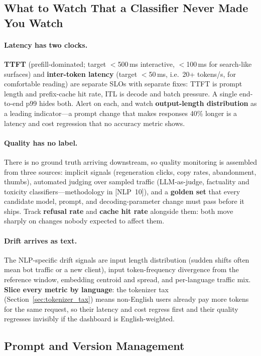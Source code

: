 \subsection{What to Watch That a Classifier Never Made You Watch}

\paragraph{Latency has two clocks.}  \textbf{TTFT} (prefill-dominated; target
$<$500\,ms interactive, $<$100\,ms for search-like surfaces) and
\textbf{inter-token latency} (target $<$50\,ms, i.e.\ 20+ tokens/s, for
comfortable reading) are separate SLOs with separate fixes: TTFT is prompt
length and prefix-cache hit rate, ITL is decode and batch pressure.  A single
end-to-end p99 hides both.  Alert on each, and watch \textbf{output-length
distribution} as a leading indicator---a prompt change that makes responses
40\% longer is a latency and cost regression that no accuracy metric shows.

\paragraph{Quality has no label.}  There is no ground truth arriving
downstream, so quality monitoring is assembled from three sources: implicit
signals (regeneration clicks, copy rates, abandonment, thumbs), automated
judging over sampled traffic (LLM-as-judge, factuality and toxicity
classifiers---methodology in [NLP~10]), and a \textbf{golden set} that every
candidate model, prompt, and decoding-parameter change must pass before it
ships.  Track \textbf{refusal rate} and \textbf{cache hit rate} alongside
them: both move sharply on changes nobody expected to affect them.

\paragraph{Drift arrives as text.}  The NLP-specific drift signals are input
length distribution (sudden shifts often mean bot traffic or a new client),
input token-frequency divergence from the reference window, embedding
centroid and spread, and per-language traffic mix.  \textbf{Slice every metric
by language}: the tokenizer tax (Section~\ref{sec:tokenizer_tax}) means
non-English users already pay more tokens for the same request, so their
latency and cost regress first and their quality regresses invisibly if the
dashboard is English-weighted.

\subsection{Prompt and Version Management}

